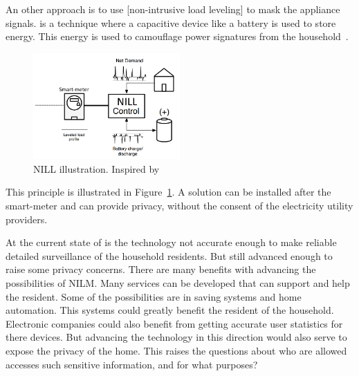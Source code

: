 An other approach is to use [non-intrusive load leveling] to mask the appliance signals.  is a technique where a capacitive device like a battery is used to store energy. This energy is used to camouflage power signatures from the household~\citep{RefWorks:36}. 

\begin{figure}[H]
\centering
\includegraphics[width=0.5\textwidth]{billeder/NILLILU.png}
\caption[NILL illustration.]{NILL illustration. Inspired by~\citep{RefWorks:36}}
\label{fig:NILL}
\end{figure}

This principle is illustrated in Figure~\ref{fig:NILL}. A  solution can be installed after the smart-meter and can provide privacy, without the consent of the electricity utility providers.

At the current state of  is the technology not accurate enough to make reliable detailed surveillance of the household residents. But still advanced enough to raise some privacy concerns. There are many benefits with advancing the possibilities of NILM. Many services can be developed that can support and help the resident. Some of the possibilities are in saving systems and home automation. This systems could greatly benefit the resident of the household. Electronic companies could also benefit from getting accurate user statistics for there devices. But advancing the technology in this direction would also serve to expose the privacy of the home. This raises the questions about who are allowed accesses such sensitive information, and for what purposes?